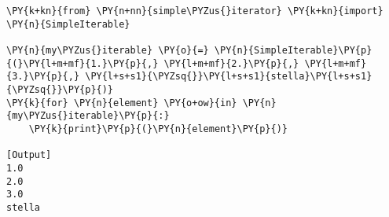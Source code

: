 \begin{Verbatim}[label=\makebox{\url{https://github.com/lucabaldini/cmepda/tree/master/slides/latex/snippets/test\_simple\_iterator.py}},commandchars=\\\{\}]
\PY{k+kn}{from} \PY{n+nn}{simple\PYZus{}iterator} \PY{k+kn}{import} \PY{n}{SimpleIterable}
   
\PY{n}{my\PYZus{}iterable} \PY{o}{=} \PY{n}{SimpleIterable}\PY{p}{(}\PY{l+m+mf}{1.}\PY{p}{,} \PY{l+m+mf}{2.}\PY{p}{,} \PY{l+m+mf}{3.}\PY{p}{,} \PY{l+s+s1}{\PYZsq{}}\PY{l+s+s1}{stella}\PY{l+s+s1}{\PYZsq{}}\PY{p}{)}
\PY{k}{for} \PY{n}{element} \PY{o+ow}{in} \PY{n}{my\PYZus{}iterable}\PY{p}{:}
    \PY{k}{print}\PY{p}{(}\PY{n}{element}\PY{p}{)}

[Output]
1.0
2.0
3.0
stella
\end{Verbatim}